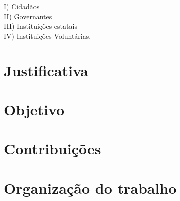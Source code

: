 \begin{minipage}{.66\textwidth}	
    I) Cidadãos \\
    II) Governantes \\
    III) Instituições estatais \\
    IV) Instituições Voluntárias. \\
\end{minipage}


\section{Justificativa}
\label{sec:justificativa}

\section{Objetivo}
\label{sec:objetivo}

\section{Contribuições}
\label{sec:contribuicoes}

\section{Organização do trabalho}
\label{sec:organizacao}